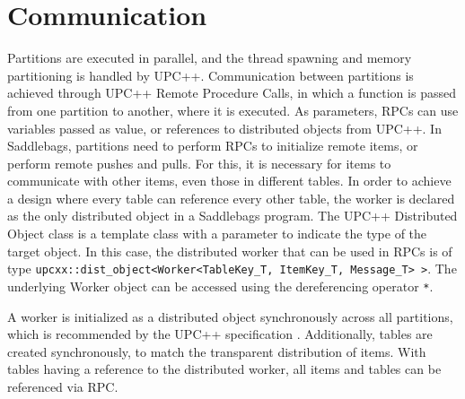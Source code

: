 \documentclass{uit-report}
\begin{document}


\section{Communication}
Partitions are executed in parallel, and the thread spawning and memory partitioning is handled by UPC++. Communication between partitions is achieved through UPC++ Remote Procedure Calls, in which a function is passed from one partition to another, where it is executed. As parameters, RPCs can use variables passed as value, or references to distributed objects from UPC++. In Saddlebags, partitions need to perform RPCs to initialize remote items, or perform remote pushes and pulls. For this, it is necessary for items to communicate with other items, even those in different tables. In order to achieve a design where every table can reference every other table, the worker is declared as the only distributed object in a Saddlebags program. The UPC++ Distributed Object class is a template class with a parameter to indicate the type of the target object. In this case, the distributed worker that can be used in RPCs is of type \texttt{upcxx::dist\_object<Worker<TableKey\_T, ItemKey\_T, Message\_T> >}. The underlying Worker object can be accessed using the dereferencing operator \texttt{*}.

A worker is initialized as a distributed object synchronously across all partitions, which is recommended by the UPC++ specification \cite{upc_language_specification}. Additionally, tables are created synchronously, to match the transparent distribution of items. With tables having a reference to the distributed worker, all items and tables can be referenced via RPC.
\end{document}
